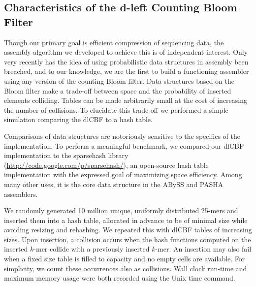 \documentclass[a4,center,fleqn]{NAR}
\begin{document}
\subsection{Characteristics of the d-left Counting Bloom Filter}


Though our primary goal is efficient compression of sequencing data, the
assembly algorithm we developed to achieve this is of independent interest.
Only very recently has the idea of using probabilistic data structures in
assembly been breached, and to our knowledge, we are the first to build a
functioning assembler using any version of the counting Bloom filter. Data
structures based on the Bloom filter make a trade-off between space and
the probability of inserted elements colliding. Tables can be made arbitrarily
small at the cost of increasing the number of collisions. To elucidate this
trade-off we performed a simple simulation comparing the dlCBF to a hash table.

Comparisons of data structures are notoriously sensitive to the specifics of
the implementation. To perform a meaningful benchmark, we compared our dlCBF
implementation to the sparsehash library
(\url{http://code.google.com/p/sparsehash/}), an open-source hash table
implementation with the expressed goal of maximizing space efficiency. Among
many other uses, it is the core data structure in the ABySS
\citep{Simpson2011} and PASHA \citep{Liu2011} assemblers.

We randomly generated 10 million unique, uniformly distributed 25-mers and
inserted them into a hash table, allocated in advance to be of minimal size
while avoiding resizing and rehashing. We repeated this with dlCBF tables of
increasing sizes. Upon insertion, a collision occurs when the hash functions
computed on the inserted $k$-mer collide with a previously inserted $k$-mer.
An insertion may also fail when a fixed size table is filled to capacity and
no empty cells are available. For simplicity, we count these occurrences also
as collisions. Wall clock run-time and maximum memory usage were both recorded
using the Unix time command.
\end{document}
